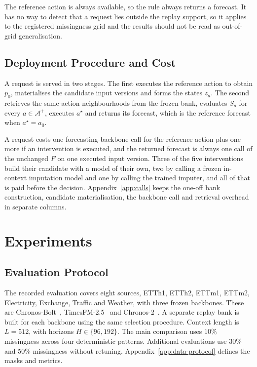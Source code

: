 \documentclass{article}
\newcommand{\calA}{\mathcal{A}}
\begin{document}
The reference action is always available, so the rule always returns a forecast. It has no way
to detect that a request lies outside the replay support, so it applies to the registered
missingness grid and the results should not be read as out-of-grid generalisation.

\subsection{Deployment Procedure and Cost}
\label{sec:method-deploy}
A request is served in two stages. The first executes the reference action to obtain $p_0$,
materialises the candidate input versions and forms the states $z_a$. The second retrieves the
same-action neighbourhoods from the frozen bank, evaluates $S_a$ for every $a \in \calA^{+}$,
executes $a^{\star}$ and returns its forecast, which is the reference forecast when
$a^{\star} = a_0$.

A request costs one forecasting-backbone call for the reference action plus one more if an
intervention is executed, and the returned forecast is always one call of the unchanged $F$ on
one executed input version. Three of the five interventions build their candidate with a model
of their own, two by calling a frozen in-context imputation model and one by calling the
trained imputer, and all of that is paid before the decision.
Appendix~\ref{app:calls} keeps the one-off bank construction, candidate materialisation, the
backbone call and retrieval overhead in separate columns.

\section{Experiments}
\label{sec:exp}

\subsection{Evaluation Protocol}
\label{sec:exp-setup}
The recorded evaluation covers eight sources, ETTh1, ETTh2, ETTm1, ETTm2, Electricity,
Exchange, Traffic and Weather, with three frozen backbones. These are
Chronos-Bolt~\citep{chronosbolt2025}, TimesFM-2.5~\citep{das2024timesfm} and
Chronos-2~\citep{chronos2_2025}. A separate replay bank is built for each backbone using the
same selection procedure. Context length is $L=512$, with horizons $H \in \{96,192\}$.
The main comparison uses $10\%$ missingness across four deterministic patterns.
Additional evaluations use $30\%$ and $50\%$ missingness without retuning.
Appendix~\ref{app:data-protocol} defines the masks and metrics.
\end{document}
